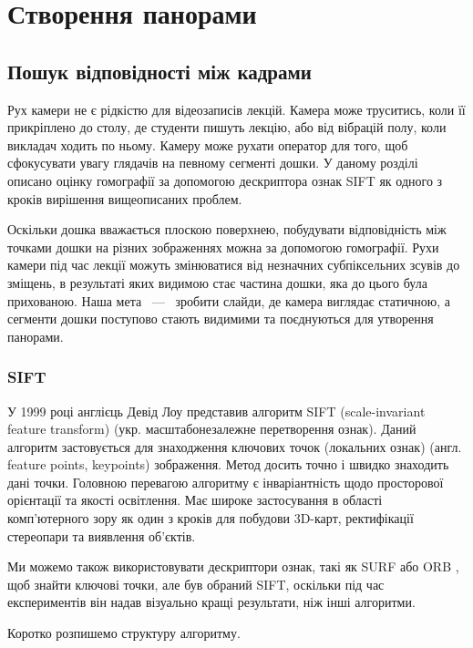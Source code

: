 \section{Створення панорами}

\subsection{Пошук відповідності між кадрами}

Рух камери не є рідкістю для відеозаписів лекцій. Камера може труситись,
коли її прикріплено до столу, де студенти пишуть лекцію, або від
вібрацій полу, коли викладач ходить по ньому. Камеру може рухати
оператор для того, щоб сфокусувати увагу глядачів на певному сегменті
дошки. У даному розділі описано оцінку гомографії за допомогою
дескриптора ознак SIFT як одного з кроків вирішення вищеописаних
проблем.

Оскільки дошка вважається плоскою поверхнею, побудувати відповідність
між точками дошки на різних зображеннях можна за допомогою гомографії.
Рухи камери під час лекції можуть змінюватися від незначних
субпіксельних зсувів до зміщень, в результаті яких видимою стає частина
дошки, яка до цього була прихованою. Наша мета ~---~ зробити слайди, де
камера виглядає статичною, а сегменти дошки поступово стають видимими та
поєднуються для утворення панорами.

\subsubsection{SIFT}

У 1999 році англієць Девід Лоу представив алгоритм SIFT (scale-invariant feature transform)
\cite{bib:sift} (укр. масштабонезалежне перетворення ознак). Даний алгоритм
застовується для знаходження ключових точок (локальних ознак) (англ. feature points, keypoints) зображення.
Метод досить точно і швидко знаходить дані точки.
Головною перевагою алгоритму є інваріантність щодо просторової орієнтації та якості освітлення.
Має широке застосування в області комп'ютерного зору як один з кроків для побудови 3D-карт,
ректифікації стереопари та виявлення об'єктів.

Ми можемо також використовувати дескриптори ознак, такі як SURF \cite{bib:surf} або ORB \cite{bib:orb},
щоб знайти ключові точки, але був обраний SIFT,
оскільки під час експериментів він надав візуально кращі результати, ніж
інші алгоритми.

Коротко розпишемо структуру алгоритму.

